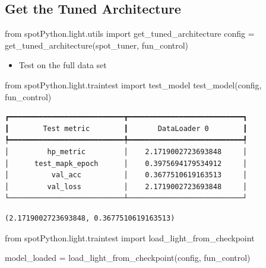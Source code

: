 \documentclass[
  letterpaper,
  DIV=11,
  numbers=noendperiod]{scrreprt}
\newenvironment{Shaded}{\begin{snugshade}}{\end{snugshade}}
\newcommand{\ImportTok}[1]{\textcolor[rgb]{0.00,0.46,0.62}{#1}}
\newcommand{\NormalTok}[1]{\textcolor[rgb]{0.00,0.23,0.31}{#1}}
\newcommand{\OperatorTok}[1]{\textcolor[rgb]{0.37,0.37,0.37}{#1}}
\providecommand{\tightlist}{%
  \setlength{\itemsep}{0pt}\setlength{\parskip}{0pt}}\usepackage{longtable,booktabs,array}
\begin{document}
\hypertarget{sec-get-spot-results-31}{%
\subsection{Get the Tuned Architecture}\label{sec-get-spot-results-31}}

\begin{Shaded}
\begin{Highlighting}[]
\ImportTok{from}\NormalTok{ spotPython.light.utils }\ImportTok{import}\NormalTok{ get\_tuned\_architecture}
\NormalTok{config }\OperatorTok{=}\NormalTok{ get\_tuned\_architecture(spot\_tuner, fun\_control)}
\end{Highlighting}
\end{Shaded}

\begin{itemize}
\tightlist
\item
  Test on the full data set
\end{itemize}

\begin{Shaded}
\begin{Highlighting}[]
\ImportTok{from}\NormalTok{ spotPython.light.traintest }\ImportTok{import}\NormalTok{ test\_model}
\NormalTok{test\_model(config, fun\_control)}
\end{Highlighting}
\end{Shaded}

\begin{verbatim}
┏━━━━━━━━━━━━━━━━━━━━━━━━━━━┳━━━━━━━━━━━━━━━━━━━━━━━━━━━┓
┃        Test metric        ┃       DataLoader 0        ┃
┡━━━━━━━━━━━━━━━━━━━━━━━━━━━╇━━━━━━━━━━━━━━━━━━━━━━━━━━━┩
│         hp_metric         │    2.1719002723693848     │
│      test_mapk_epoch      │    0.3975694179534912     │
│          val_acc          │    0.3677510619163513     │
│         val_loss          │    2.1719002723693848     │
└───────────────────────────┴───────────────────────────┘
\end{verbatim}

\begin{verbatim}
(2.1719002723693848, 0.3677510619163513)
\end{verbatim}

\begin{Shaded}
\begin{Highlighting}[]
\ImportTok{from}\NormalTok{ spotPython.light.traintest }\ImportTok{import}\NormalTok{ load\_light\_from\_checkpoint}

\NormalTok{model\_loaded }\OperatorTok{=}\NormalTok{ load\_light\_from\_checkpoint(config, fun\_control)}
\end{Highlighting}
\end{Shaded}
\end{document}
